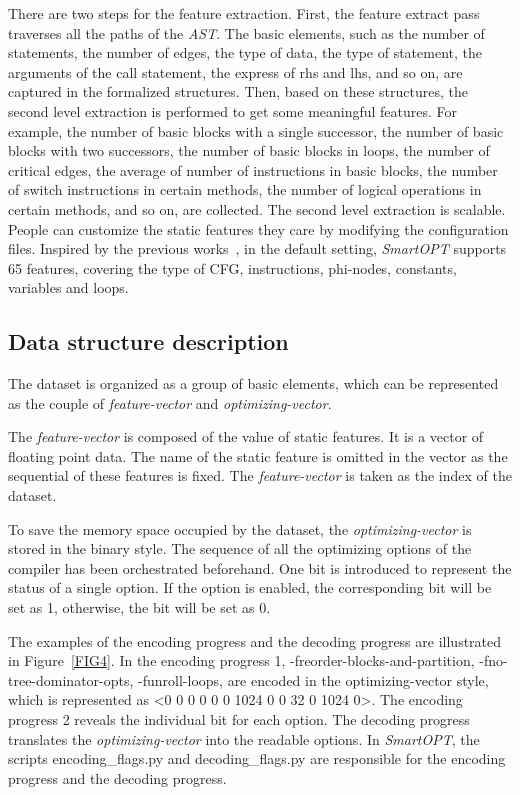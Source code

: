 \documentclass[bst/sn-mathphys]{sn-jnl}%
\theoremstyle{thmstyleone}%
\theoremstyle{thmstyletwo}%
\theoremstyle{thmstylethree}%
\begin{document}
There are two steps for the feature extraction. First, the feature extract 
pass traverses all the paths of the \emph{AST}. The basic elements, such as 
the number of statements, the number of edges, the type of data, the type of 
statement, the arguments of the call statement, the express of rhs and lhs, 
and so on, are captured in the formalized structures. Then, based on these 
structures, the second level extraction is performed to get some meaningful 
features. For example, the number of basic blocks with a single successor, the 
number of basic blocks with two successors, the number of basic blocks in 
loops, the number of critical edges, the average of number of instructions in 
basic blocks, the number of switch instructions in certain methods, the number 
of logical operations in certain methods, and so on, are collected. The second 
level extraction is scalable. People can customize the static features they 
care by modifying the configuration files. Inspired by the previous 
works~\cite{fursin2021collective,fursin2011milepost}, in the default setting, 
\emph{SmartOPT} supports 65 features, covering the type of CFG, instructions, 
phi-nodes, constants, variables and loops.

\subsection{Data structure description}\label{sec0404}

The dataset is organized as a group of basic elements, which can be represented 
as the couple of \emph{feature-vector} and \emph{optimizing-vector}.

The \emph{feature-vector} is composed of the value of static features. It is a 
vector of floating point data. The name of the static feature is omitted in 
the vector as the sequential of these features is fixed. The 
\emph{feature-vector} is taken as the index of the dataset.

To save the memory space occupied by the dataset, the \emph{optimizing-vector} 
is stored in the binary style. The sequence of all the optimizing options of 
the compiler has been orchestrated beforehand. One bit is introduced to 
represent the status of a single option. If the option is enabled, the 
corresponding bit will be set as 1, otherwise, the bit will be set as 0.

The examples of the encoding progress and the decoding progress are illustrated in Figure~\ref{FIG4}. In the encoding progress 1, 
-freorder-blocks-and-partition, -fno-tree-dominator-opts, -funroll-loops, are 
encoded in the optimizing-vector style, which is represented as 
<0 0 0 0 0 0 1024 0 0 32 0 1024 0>. The encoding progress 2 reveals the 
individual bit for each option. The decoding progress translates the 
\emph{optimizing-vector} into the readable options. In \emph{SmartOPT}, the 
scripts encoding\_flags.py and decoding\_flags.py are responsible for the 
encoding progress and the decoding progress.
\end{document}
